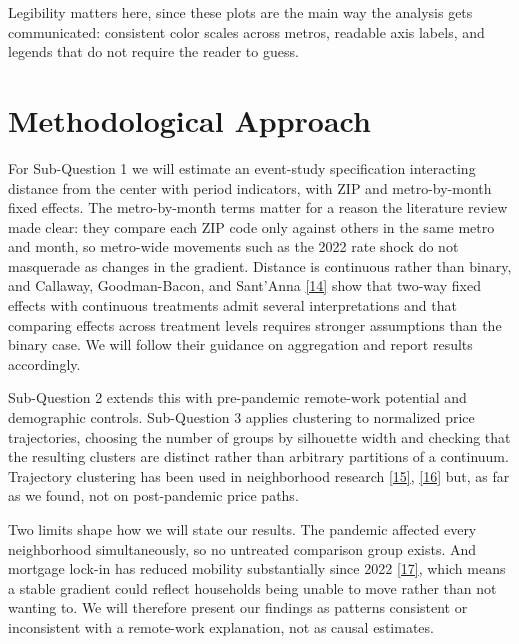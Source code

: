 \documentclass[11pt]{article}
\newcommand{\refl}[2]{\href{#2}{[#1]}}
\newcommand{\uCall}{https://www.nber.org/papers/w32117}
\newcommand{\uDelm}{https://doi.org/10.1080/00045608.2015.1096188}
\newcommand{\uDelmb}{https://doi.org/10.1111/gean.70006}
\newcommand{\uFons}{https://doi.org/10.1111/jofi.13398}
\begin{document}
Legibility matters here, since these plots are the main way the analysis gets
communicated: consistent color scales across metros, readable axis labels, and
legends that do not require the reader to guess.

\section{Methodological Approach}

For Sub-Question 1 we will estimate an event-study specification interacting
distance from the center with period indicators, with ZIP and metro-by-month
fixed effects. The metro-by-month terms matter for a reason the literature review
made clear: they compare each ZIP code only against others in the same metro and
month, so metro-wide movements such as the 2022 rate shock do not masquerade as
changes in the gradient. Distance is continuous rather than binary, and Callaway,
Goodman-Bacon, and Sant'Anna \refl{14}{\uCall} show that two-way fixed effects
with continuous treatments admit several interpretations and that comparing
effects across treatment levels requires stronger assumptions than the binary
case. We will follow their guidance on aggregation and report results
accordingly.

Sub-Question 2 extends this with pre-pandemic remote-work potential and
demographic controls. Sub-Question 3 applies clustering to normalized price
trajectories, choosing the number of groups by silhouette width and checking that
the resulting clusters are distinct rather than arbitrary partitions of a
continuum. Trajectory clustering has been used in neighborhood research
\refl{15}{\uDelm}, \refl{16}{\uDelmb} but, as far as we found, not on
post-pandemic price paths.

Two limits shape how we will state our results. The pandemic affected every
neighborhood simultaneously, so no untreated comparison group exists. And
mortgage lock-in has reduced mobility substantially since 2022
\refl{17}{\uFons}, which means a stable gradient could reflect households being
unable to move rather than not wanting to. We will therefore present our findings
as patterns consistent or inconsistent with a remote-work explanation, not as
causal estimates.
\end{document}
